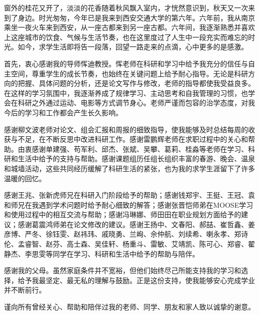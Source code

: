 窗外的桂花又开了，淡淡的花香随着秋风飘入室内，才恍然意识到，秋天又一次来到了身边。时光匆匆，今年已是我来到西安交通大学的第六年。六年前，我从南京乘坐一夜火车来到西安，从一座古都来到另一座古都。六年间，我逐渐熟悉并喜欢上这座城市的饮食、气候与生活节奏，也在这里度过了人生中一段充实而难忘的时光。如今，求学生活即将告一段落，回望一路走来的点滴，心中更多的是感激。

首先，衷心感谢我的导师恽迪教授。恽老师在科研和学习中给予我充分的信任与自主空间，尊重学生的成长节奏，也始终在关键问题上给予耐心指导。无论是科研方向的把握、具体问题的分析，还是论文写作与修改，老师的指导都使我受益良多。在这样的学习氛围中，我逐渐养成了规律学习、主动思考和自我管理的习惯，也学会在科研之外通过运动、电影等方式调节身心。老师严谨而包容的治学态度，对我今后的学习和工作都会产生长久影响。

感谢柳文波老师对论文、组会汇报和周报的细致指导，使我能够及时总结每周的收获与不足，在不断反思中改进科研工作。感谢雷鹏辉老师在求职过程中的关心和帮助。由衷感谢单建强、苟军利、邱杰、张斌、吴攀、葛莉、{\rarecharfont 桂淼}等老师在学习、科研和生活中给予的支持与帮助。感谢课题组历任组长组织丰富的春游、晚会、温泉和城墙活动，这些共同经历缓解了科研生活的紧张，也为我的求学生涯留下了许多温暖的回忆。

感谢王兆、张新虎师兄在科研入门阶段给予的帮助；感谢钱郑宇、王挺、王冠、袁和师兄在我遇到学术问题时给予耐心细致的解答；感谢张晋恺师弟在MOOSE学习和使用过程中的相互交流与帮助；感谢冯琳娜、师田田在职业规划方面给予的建议；感谢葛震鸿师弟在论文修改的建议。感谢王扬中、文春阳、{\rarecharfont 郝喆}、崔哲鑫、姜彦博、严冬、徐钰雯、{\rarecharfont 赵祎玮}、戚晓勇、兰峋、佘仲航、刘续希、喇永孝、郑诗伦、孟睿智、赵芬、高士森、吴佳轩、杨重斗、雷敏、艾靖凯、陈可心、郑睿、翟静杰、李思雯等同学在学习、科研和生活中给予的帮助与陪伴。

感谢我的父母。虽然家庭条件并不宽裕，但他们始终尽己所能支持我的学习和选择，给予我最坚定、最无私的理解与鼓励。正是这份支持，使我能够安心完成学业并不断前行。

谨向所有曾经关心、帮助和陪伴过我的老师、同学、朋友和家人致以诚挚的谢意。
